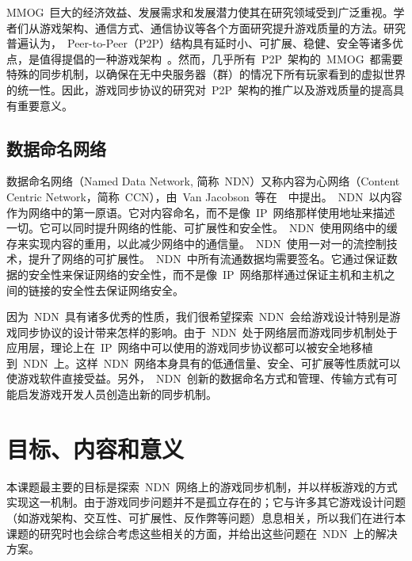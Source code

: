MMOG~巨大的经济效益、发展需求和发展潜力使其在研究领域受到广泛重视。学者们从游戏架构、通信方式、通信协议等各个方面研究提升游戏质量的方法。研究普遍认为，~Peer-to-Peer（P2P）结构具有延时小、可扩展、稳健、安全等诸多优点，是值得提倡的一种游戏架构~\cite{chandy, mimaze, Scheating, bryant, Ferretti2005}。然而，几乎所有~P2P~架构的~MMOG~都需要特殊的同步机制，以确保在无中央服务器（群）的情况下所有玩家看到的虚拟世界的统一性。因此，游戏同步协议的研究对~P2P~架构的推广以及游戏质量的提高具有重要意义。



\subsection{数据命名网络}

数据命名网络（Named Data Network, 简称~NDN）又称内容为心网络（Content Centric Network，简称~CCN），由~Van Jacobson~等在~\cite{Jndn}~中提出。~NDN~以内容作为网络中的第一原语。它对内容命名，而不是像~IP~网络那样使用地址来描述一切。它可以同时提升网络的性能、可扩展性和安全性。~NDN~使用网络中的缓存来实现内容的重用，以此减少网络中的通信量。~NDN~使用一对一的流控制技术，提升了网络的可扩展性。~NDN~中所有流通数据均需要签名。它通过保证数据的安全性来保证网络的安全性，而不是像~IP~网络那样通过保证主机和主机之间的链接的安全性去保证网络安全。

因为~NDN~具有诸多优秀的性质，我们很希望探索~NDN~会给游戏设计特别是游戏同步协议的设计带来怎样的影响。由于~NDN~处于网络层而游戏同步机制处于应用层，理论上在~IP~网络中可以使用的游戏同步协议都可以被安全地移植到~NDN~上。这样~NDN~网络本身具有的低通信量、安全、可扩展等性质就可以使游戏软件直接受益。另外，~NDN~创新的数据命名方式和管理、传输方式有可能启发游戏开发人员创造出新的同步机制。

\section{目标、内容和意义}
\label{goals}

本课题最主要的目标是探索~NDN~网络上的游戏同步机制，并以样板游戏的方式实现这一机制。由于游戏同步问题并不是孤立存在的；它与许多其它游戏设计问题（如游戏架构、交互性、可扩展性、反作弊等问题）息息相关，所以我们在进行本课题的研究时也会综合考虑这些相关的方面，并给出这些问题在~NDN~上的解决方案。

